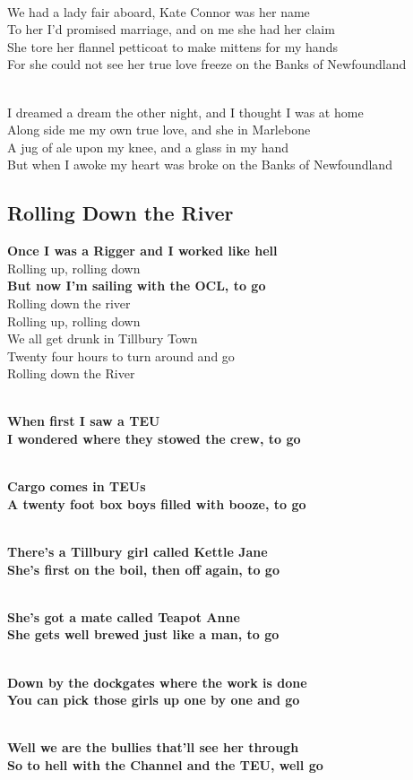 \documentclass[letterpaper,12pt]{article}
\begin{document}
\noindent
\\We had a lady fair aboard, Kate Connor was her name
\\To her I'd promised marriage, and on me she had her claim
\\She tore her flannel petticoat to make mittens for my hands
\\For she could not see her true love freeze on the Banks of Newfoundland

\noindent
\\I dreamed a dream the other night, and I thought I was at home
\\Along side me my own true love, and she in Marlebone
\\A jug of ale upon my knee, and a glass in my hand
\\But when I awoke my heart was broke on the Banks of Newfoundland
\newpage

\begin{multicols}{2}
\subsection{Rolling Down the River}

\noindent
\textbf{Once I was a Rigger and I worked like hell}
\\Rolling up, rolling down
\\\textbf{But now I'm sailing with the OCL, to go}
\\Rolling down the river
\\Rolling up, rolling down
\\We all get drunk in Tillbury Town
\\Twenty four hours to turn around and go
\\Rolling down the River

\noindent
\\\textbf{When first I saw a TEU}
\\\textbf{I wondered where they stowed the crew, to go}

\noindent
\\\textbf{Cargo comes in TEUs}
\\\textbf{A twenty foot box boys filled with booze, to go}

\noindent
\\\textbf{There's a Tillbury girl called Kettle Jane}
\\\textbf{She's first on the boil, then off again, to go}

\noindent
\\\textbf{She's got a mate called Teapot Anne}
\\\textbf{She gets well brewed just like a man, to go}

\noindent
\\\textbf{Down by the dockgates where the work is done}
\\\textbf{You can pick those girls up one by one and go}

\noindent
\\\textbf{Well we are the bullies that'll see her through}
\\\textbf{So to hell with the Channel and the TEU, well go}

\end{multicols}
\end{document}

